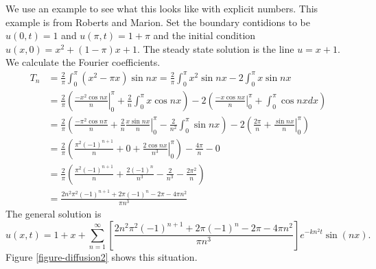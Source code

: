 \documentclass[fleqn,letterpaper]{report}
\begin{document}
\begin{example}
We use an example to see what this looks like with explicit
numbers. This example is from Roberts and Marion.  Set the
boundary contidions to be $u(0,t) = 1$ and $u(\pi, t) = 1 +
\pi$ and the initial condition $u(x,0) = x^2 + (1-\pi)x + 1$.
The steady state solution is the line $u = x+1$. We calculate
the Fourier coefficients. 
\begin{align*}
T_n & = \frac{2}{\pi} \int_0^\pi (x^2 - \pi x) \sin nx =
\frac{2}{\pi} \int_0^\pi x^2 \sin nx 
- 2 \int_0^\pi x\sin nx \\
& = \frac{2}{\pi} \left( \left. \frac{-x^2 \cos nx}{n}
\right|_0^\pi + \frac{2}{n} \int_0^\pi x \cos nx \right) -
2 \left( \left. \frac{-x \cos nx}{n} \right|_0^{\pi} +
\int_0^{\pi} \cos nx dx \right) \\
& = \frac{2}{\pi} \left( \frac{-\pi^2 \cos n\pi}{n} +
\left. \frac{2}{n} \frac{x \sin nx}{n} \right|_0^\pi -
\frac{2}{n^2} \int_0^\pi \sin nx \right) - 2 \left(
\frac{2\pi}{n} + \left. \frac{\sin nx}{n} \right|_0^{\pi}
\right) \\
& = \frac{2}{\pi} \left( \frac{\pi^2 (-1)^{n+1}}{n} + 0 + \left.
\frac{2\cos nx}{n^3} \right|_0^\pi \right) - \frac{4\pi}{n} -
0\\
& = \frac{2}{\pi} \left( \frac{\pi^2 (-1)^{n+1}}{n} +
\frac{2(-1)^n}{n^3} - \frac{2}{n^3} - \frac{2\pi^2}{n}\right) \\
& = \frac{2n^2 \pi^2 (-1)^{n+1} + 2\pi (-1)^n - 2\pi - 4\pi
n^2 }{\pi n^3}
\end{align*}
The general solution is
\begin{equation*}
u(x,t) = 1 + x + \sum_{n=1}^\infty \left[ \frac{2n^2 \pi^2
(-1)^{n+1} + 2\pi (-1)^n - 2\pi - 4\pi n^2}{\pi n^3} \right] e^{-kn^2t}
\sin (nx).
\end{equation*}
Figure \ref{figure-diffusion2} shows this situation.
\end{example}
\end{document}
